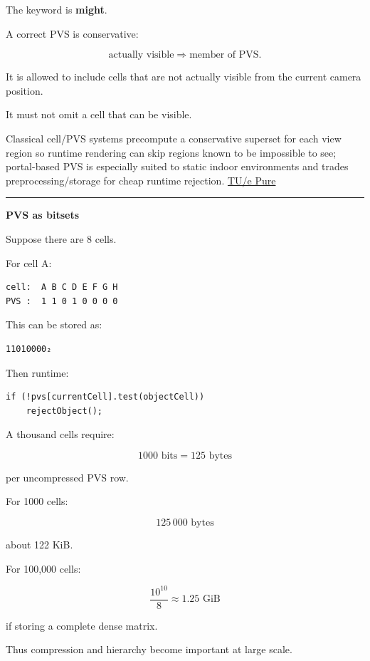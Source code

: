 The keyword is \textbf{might}.

A correct PVS is conservative:

\[
\text{actually visible}
\Rightarrow
\text{member of PVS}.
\]

It is allowed to include cells that are not actually visible from the current camera position.

It must not omit a cell that can be visible.

Classical cell/PVS systems precompute a conservative superset for each view region so runtime rendering can skip regions known to be impossible to see; portal-based PVS is especially suited to static indoor environments and trades preprocessing/storage for cheap runtime rejection. \href{https://pure.tue.nl/ws/files/46823201/556098-1.pdf?utm_source=chatgpt.com}{TU/e Pure}

\begin{center}\rule{0.5\linewidth}{0.5pt}\end{center}

\textbf{PVS as bitsets}

Suppose there are 8 cells.

For cell A:

\begin{verbatim}
cell:  A B C D E F G H
PVS :  1 1 0 1 0 0 0 0
\end{verbatim}

This can be stored as:

\begin{verbatim}
11010000₂
\end{verbatim}

Then runtime:

\begin{verbatim}
if (!pvs[currentCell].test(objectCell))
    rejectObject();
\end{verbatim}

A thousand cells require:

\[
1000\text{ bits}
=
125\text{ bytes}
\]

per uncompressed PVS row.

For 1000 cells:

\[
125\,000\text{ bytes}
\]

about 122 KiB.

For 100,000 cells:

\[
\frac{10^{10}}8
\approx1.25\text{ GiB}
\]

if storing a complete dense matrix.

Thus compression and hierarchy become important at large scale.

